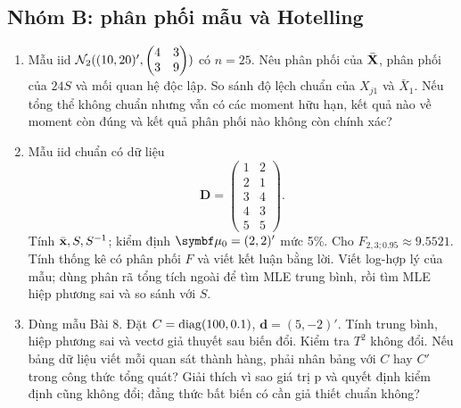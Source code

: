 \subsection{Nhóm B: phân phối mẫu và Hotelling}
\begin{enumerate}[label=\textbf{Bài \arabic*.},ref=\arabic*,resume=practice]
\item Mẫu iid $\mathcal N_2((10,20)',\begin{pmatrix}4&3\\3&9\end{pmatrix})$
có $n=25$. Nêu phân phối của $\bar{\mathbf X}$, phân phối của $24S$ và mối quan
hệ độc lập. So sánh độ lệch chuẩn của $X_{j1}$ và $\bar X_1$.
Nếu tổng thể không chuẩn nhưng vẫn có các moment hữu hạn, kết quả nào
về moment còn đúng và kết quả phân phối nào không còn chính xác?

\item Mẫu iid chuẩn có dữ liệu
\[
 \mathbf D=\begin{pmatrix}1&2\\2&1\\3&4\\4&3\\5&5\end{pmatrix}.
\]
Tính $\bar{\mathbf x},S,S^{-1}$; kiểm định $\vmu_0=(2,2)'$ mức 5\%.
Cho $F_{2,3;0.95}\approx9.5521$.
Tính thống kê có phân phối $F$ và viết kết luận bằng lời.
Viết log-hợp lý của mẫu; dùng phân rã tổng tích ngoài để tìm MLE trung
bình, rồi tìm MLE hiệp phương sai và so sánh với $S$.

\item Dùng mẫu Bài 8. Đặt
$C=\operatorname{diag}(100,0.1)$, $\mathbf d=(5,-2)'$.
Tính trung bình, hiệp phương sai và vectơ giả thuyết sau biến đổi.
Kiểm tra $T^2$ không đổi. Nếu bảng dữ liệu viết mỗi quan sát thành hàng,
phải nhân bảng với $C$ hay $C'$ trong công thức tổng quát?
Giải thích vì sao giá trị p và quyết định kiểm định cũng không đổi;
đẳng thức bất biến có cần giả thiết chuẩn không?
\end{enumerate}

